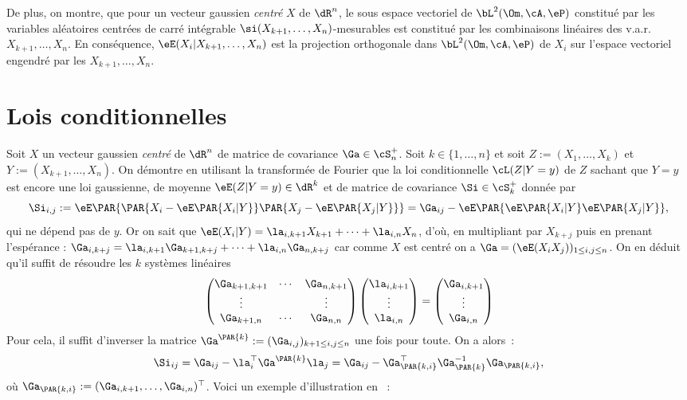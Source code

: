 {{De plus, on montre, que pour un vecteur gaussien \emph{centré} $X$ de $\dR^n$,
le sous espace vectoriel de $\bL^2(\Om,\cA,\eP)$ constitué par les variables
aléatoires centrées de carré intégrable $\si(X_{k+1},\ldots,X_n)$-mesurables
est constitué par les combinaisons linéaires des v.a.r. $X_{k+1},\ldots,X_n$.
En conséquence, $\eE(X_i\vert X_{k+1},\ldots,X_n)$ est la projection
orthogonale dans $\bL^2(\Om,\cA,\eP)$ de $X_i$ sur l'espace vectoriel engendré
par les $X_{k+1},\ldots,X_n$.

\section{Lois conditionnelles}

Soit $X$ un vecteur gaussien \emph{centré} de $\dR^n$ de matrice de covariance
$\Ga\in\cS_n^+$. Soit $k\in\{1,\ldots,n\}$ et soit $Z:=(X_1,\ldots,X_k)$ et
$Y:=(X_{k+1},\ldots,X_n)$. On démontre en utilisant la transformée de Fourier
que la loi conditionnelle $\cL(Z\vert Y=y)$ de $Z$ sachant que $Y=y$ est
encore une loi gaussienne, de moyenne $\eE(Z\vert Y=y)\in\dR^k$ et de matrice
de covariance $\Si\in\cS^+_k$ donnée par
$$
\Si_{i,j}:=\eE\PAR{\PAR{X_i-\eE\PAR{X_i\vert Y}}\PAR{X_j-\eE\PAR{X_j\vert
      Y}}} = \Ga_{ij}-\eE\PAR{\eE\PAR{X_i\vert Y}\eE\PAR{X_j\vert Y}},
$$
qui ne dépend pas de $y$. Or on sait que $\eE(X_i\vert Y)=\la_{i,k+1}
X_{k+1}+\cdots+\la_{i,n} X_n$, d'où, en multipliant par $X_{k+j}$ puis en
prenant l'espérance : $\Ga_{i,k+j}=\la_{i,k+1} \Ga_{k+1,k+j}+\cdots+\la_{i,n}
\Ga_{n,k+j}$ car comme $X$ est centré on a $\Ga=(\eE(X_i X_j))_{1\leq i,j \leq
  n}$. On en déduit qu'il suffit de résoudre les $k$ systèmes linéaires
$$
\begin{pmatrix} \Ga_{k+1,k+1} & \cdots & \Ga_{n,k+1} \\ 
                \vdots        &        & \vdots \\ 
                \Ga_{k+1,n}   & \cdots & \Ga_{n,n}
\end{pmatrix}
\begin{pmatrix} \la_{i,k+1} \\ \vdots \\ \la_{i,n}\end{pmatrix} 
=\begin{pmatrix} \Ga_{i,k+1} \\ \vdots \\ \Ga_{i,n}\end{pmatrix}
$$
Pour cela, il suffit d'inverser la matrice
$\Ga^{\PAR{k}}:=(\Ga_{i,j})_{k+1\leq i,j \leq n}$ une fois pour toute. On a
alors~:
$$
\Si_{ij}=\Ga_{ij}-\la_i^\top\Ga^\PAR{k}\la_j
        =\Ga_{ij}-\Ga_\PAR{k,i}^\top \Ga_\PAR{k}^{-1} \Ga_\PAR{k,i},
$$
où $\Ga_\PAR{k,i}:=(\Ga_{i,k+1},\ldots,\Ga_{i,n})^\top$. Voici un
exemple d'illustration en \ML{}~:
%
%
%

}}
